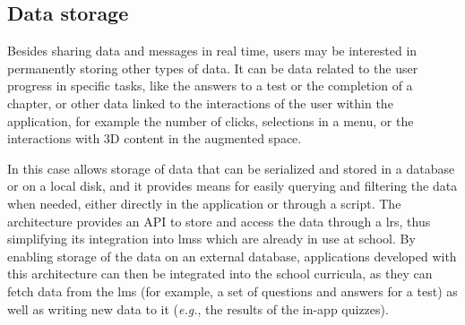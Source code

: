 

\subsection{Data storage}\label{arch:architecture:logging}

Besides sharing data and messages in real time, users may be interested in permanently storing other types of data. It can be data related to the user progress in specific tasks, like the answers to a test or the completion of a chapter, or other data linked to the interactions of the user within the application, for example the number of clicks, selections in a menu, or the interactions with 3D content in the augmented space.

In this case \arch{} allows storage of data that can be serialized and stored in a database or on a local disk, and it provides means for easily querying and filtering the data when needed, either directly in the application or through a script. The architecture provides an API to store and access the data through a \gls{lrs}, thus simplifying its integration into \glspl{lms} which are already in use at school. By enabling storage of the data on an external database, applications developed with this architecture can then be integrated into the school curricula, as they can fetch data from the \gls{lms} (for example, a set of questions and answers for a test) as well as writing new data to it (\textit{e.g.}, the results of the in-app quizzes).

